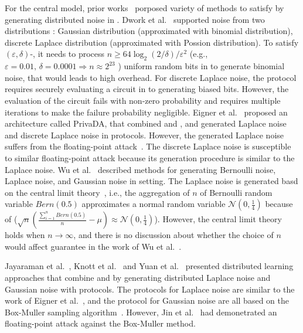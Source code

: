For the central \differentialprivacy model, prior works~\cite{dwork2006our, eigner2014differentially,wu2016inherit,jayaraman2018distributed,knott2021crypten,yuan2021practical,eriguchi2021efficient} porposed variety of methods to satisfy \differentialprivacy by generating distributed noise in \smpc.
Dwork et al.~\cite{dwork2006our} supported noise from two distributions : Gaussian distribution (approximated with binomial distribution), discrete Laplace distribution (approximated with Possion distribution).
To satisfy $\left(\varepsilon ,\delta \right) $-\differentialprivacy, it needs to process $n\geq 64 \log_2{\left(2/\delta \right) }/\varepsilon ^2$ (e.g., $\varepsilon =0.01 \text{, }\delta=0.0001\Rightarrow n\approx 2^{23}$ ) uniform random bits in \smpc to generate binomial noise, that would leads to high \smpc overhead.
For discrete Laplace noise, the protocol requires securely evaluating a circuit in \smpc to generating biased bits. However, the evaluation of the circuit fails with non-zero probability and requires multiple iterations to make the failure probability negligible.
Eigner et al.~\cite{eigner2014differentially} proposed an architecture called PrivaDA, that combined \differentialprivacy and \smpc, and generated Laplace noise and discrete Laplace noise in \smpc protocols. However, the generated Laplace noise suffers from the floating-point attack~\cite{mironov2012significance}. The discrete Laplace noise is susceptible to similar floating-point attack because its generation procedure is similar to the Laplace noise.
Wu et al.~\cite{wu2016inherit} described methods for generating Bernoulli noise, Laplace noise, and Gaussian noise in \smpc setting. The Laplace noise is generated basd on the central limit theory~\cite[Example 10.3.2]{athreya2006measure}, i.e., the aggregation of $n$ of Bernoulli random variable $Bern\left(0.5\right)$ approximates a normal random variable $\mathcal{N} \left(0,\frac{1}{4}\right)$ because of ($\sqrt{n}\left(\frac{\sum_{i = 1}^{n}  Bern\left(0.5\right) }{n}-\mu\right) \approx \mathcal{N} \left(0,\frac{1}{4}\right)   $). However, the central limit theory holds when $n \to \infty $, and there is no discussion about whether the choice of $n$ would affect \differentialprivacy guarantee in the work of Wu et al.~\cite{wu2016inherit}.

Jayaraman et al.~\cite{jayaraman2018distributed}, Knott et al.~\cite{knott2021crypten} and Yuan et al.~\cite{yuan2021practical} presented distributed learning approaches that combine \smpc and \differentialprivacy by generating distributed Laplace noise and Gaussian noise with \smpc protocols. The protocols for Laplace noise are similar to the work of Eigner et al.~\cite{eigner2014differentially}, and the protocol for Gaussian noise are all based on the Box-Muller sampling algorithm~\cite{box1958note}. However, Jin et al.~\cite{jin2022we} had demonetrated an floating-point attack against the Box-Muller method.

